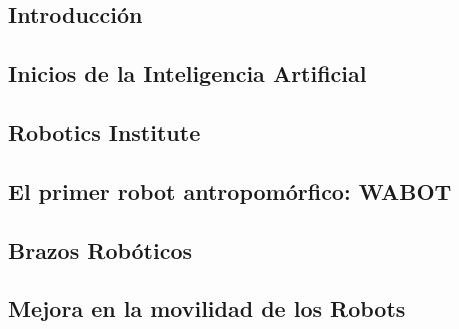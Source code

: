 \documentclass[a4paper,11pt]{article}
\begin{document}
\subsection{Introducción}


\subsection{Inicios de la Inteligencia Artificial}


\subsection{Robotics Institute}


\subsection{El primer robot antropomórfico: WABOT}


\subsection{Brazos Robóticos}


\subsection{Mejora en la movilidad de los Robots}


\normalsize


\onecolumn


\nocite{*}
\end{document}
